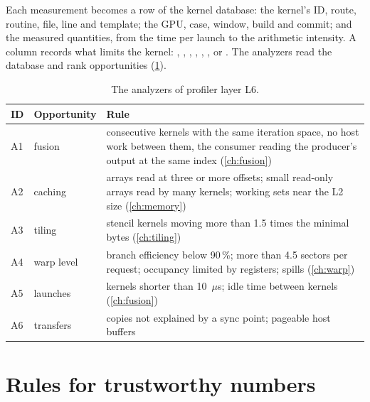 Each measurement becomes a row of the kernel database: the kernel's ID, route, routine, file, line and template; the
GPU, case, window, build and commit; and the measured quantities, from the time per launch to the arithmetic
intensity. A  column records what limits the kernel: , ,
, , , ,  or .
The analyzers read the database and rank opportunities (\cref{tab:analyzers}).

\begin{table}[ht]
\centering
\small
\begin{tabular}{lp{}p{}}
\toprule
ID & Opportunity & Rule \\
\midrule
A1 & fusion & consecutive kernels with the same iteration space, no host work between them, the consumer reading the
  producer's output at the same index (\cref{ch:fusion}) \\
A2 & caching & arrays read at three or more offsets; small read-only arrays read by many kernels; working sets
  near the L2 size (\cref{ch:memory}) \\
A3 & tiling & stencil kernels moving more than 1.5 times the minimal bytes (\cref{ch:tiling}) \\
A4 & warp level & branch efficiency below 90\,\%; more than 4.5 sectors per request; occupancy limited by registers;
  spills (\cref{ch:warp}) \\
A5 & launches & kernels shorter than 10~$\mu$s; idle time between kernels (\cref{ch:fusion}) \\
A6 & transfers & copies not explained by a sync point; pageable host buffers \\
\bottomrule
\end{tabular}
\caption{The analyzers of profiler layer L6.}
\label{tab:analyzers}
\end{table}

\section{Rules for trustworthy numbers}


